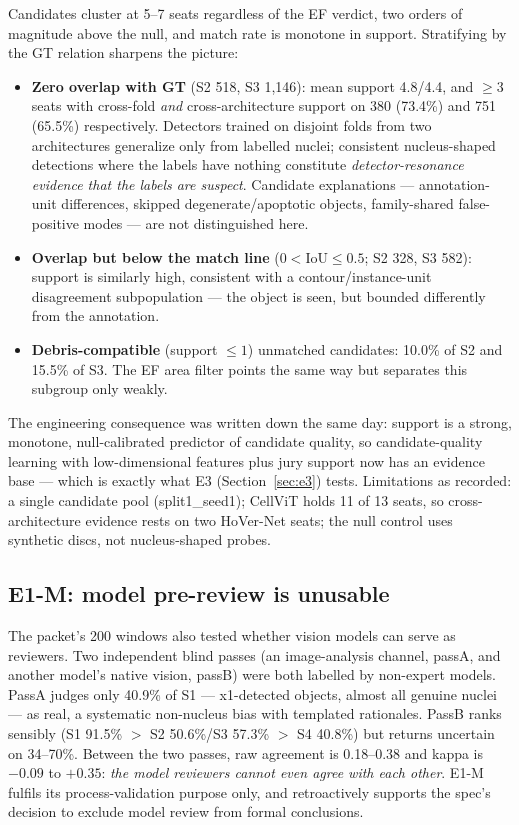 \documentclass[11pt,a4paper]{article}
\begin{document}
Candidates cluster at 5--7 seats regardless of the EF verdict, two orders of magnitude above the null, and match rate is monotone in support. Stratifying by the GT relation sharpens the picture:

\begin{itemize}
\item \textbf{Zero overlap with GT} (S2 518, S3 1,146): mean support 4.8/4.4, and $\geq$3 seats with cross-fold \emph{and} cross-architecture support on 380 (73.4\%) and 751 (65.5\%) respectively. Detectors trained on disjoint folds from two architectures generalize only from labelled nuclei; consistent nucleus-shaped detections where the labels have nothing constitute \emph{detector-resonance evidence that the labels are suspect}. Candidate explanations --- annotation-unit differences, skipped degenerate/apoptotic objects, family-shared false-positive modes --- are not distinguished here.
\item \textbf{Overlap but below the match line} ($0<\text{IoU}\leq0.5$; S2 328, S3 582): support is similarly high, consistent with a contour/instance-unit disagreement subpopulation --- the object is seen, but bounded differently from the annotation.
\item \textbf{Debris-compatible} (support $\leq1$) unmatched candidates: 10.0\% of S2 and 15.5\% of S3. The EF area filter points the same way but separates this subgroup only weakly.
\end{itemize}

The engineering consequence was written down the same day: support is a strong, monotone, null-calibrated predictor of candidate quality, so candidate-quality learning with low-dimensional features plus jury support now has an evidence base --- which is exactly what E3 (Section~\ref{sec:e3}) tests. Limitations as recorded: a single candidate pool (split1\_seed1); CellViT holds 11 of 13 seats, so cross-architecture evidence rests on two HoVer-Net seats; the null control uses synthetic discs, not nucleus-shaped probes.

\subsection{E1-M: model pre-review is unusable}

The packet's 200 windows also tested whether vision models can serve as reviewers. Two independent blind passes (an image-analysis channel, passA, and another model's native vision, passB) were both labelled by non-expert models. PassA judges only 40.9\% of S1 --- x1-detected objects, almost all genuine nuclei --- as real, a systematic non-nucleus bias with templated rationales. PassB ranks sensibly (S1 91.5\% $>$ S2 50.6\%/S3 57.3\% $>$ S4 40.8\%) but returns uncertain on 34--70\%. Between the two passes, raw agreement is 0.18--0.38 and kappa is $-0.09$ to $+0.35$: \emph{the model reviewers cannot even agree with each other}. E1-M fulfils its process-validation purpose only, and retroactively supports the spec's decision to exclude model review from formal conclusions.
\end{document}
